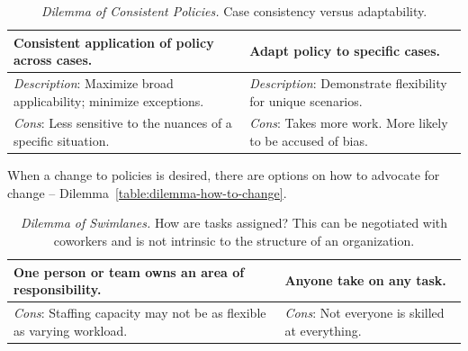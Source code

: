 \begin{center}
\begin{table}[H] %
\begin{tabular}{ | m{\dilemmatablewidth}| m{\dilemmatablewidth} | }
  \hline
  \textbf{Consistent application of policy across cases.} &
  \textbf{Adapt policy to specific cases.} \\
  \hline
  \textit{Description}: Maximize broad applicability; minimize exceptions. &
  \textit{Description}: Demonstrate flexibility for unique scenarios. \\  
  \hline
  \textit{Cons}: Less sensitive to the nuances of a specific situation. & 
  \textit{Cons}: Takes more work. More likely to be accused of bias. \\
  \hline
\end{tabular}
\caption{
\textit{Dilemma of Consistent Policies.}
Case consistency versus adaptability.
}
\label{table:dilemma-personal-policy-consistency-across-cases}
\end{table}
\end{center}

When a change to policies is desired, there are options on how to advocate for change -- Dilemma~\ref{table:dilemma-how-to-change}.



\begin{center}
\begin{table}[H] %
\begin{tabular}{ | m{\dilemmatablewidth}| m{\dilemmatablewidth} | } 
  \hline
  \textbf{One person or team owns an area of responsibility.} & 
  \textbf{Anyone take on any task.} \\ 
  \hline
  \textit{Cons}: Staffing capacity may not be as flexible as varying workload. & 
  \textit{Cons}: Not everyone is skilled at everything. \\  
  \hline
\end{tabular}
\caption{
\textit{Dilemma of Swimlanes.} 
How are tasks assigned? This can be negotiated with coworkers and is not intrinsic to the structure of an organization. 
}
\label{table:dilemma-personal-swimlanes}
\end{table}
\end{center}


